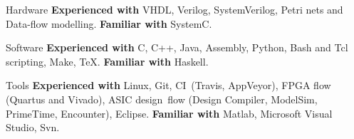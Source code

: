 
\vspace{-1mm}
\begin{cvskills}

\cvskill
{Hardware}
{\textbf{Experienced with} VHDL, Verilog, SystemVerilog, Petri nets and 
Data-flow modelling. \textbf{Familiar with} SystemC.}

\cvskill
{Software}
{\textbf{Experienced with} C, C++, Java, Assembly, Python, Bash and Tcl 
scripting, Make, TeX. \textbf{Familiar with} Haskell.}

\cvskill
{Tools}
{\textbf{Experienced with} Linux, Git, CI~(Travis, AppVeyor), FPGA 
flow (Quartus and Vivado), ASIC design~flow (Design Compiler, ModelSim, 
PrimeTime, Encounter), Eclipse. \textbf{Familiar with} Matlab, 
Microsoft Visual Studio, Svn.}

\end{cvskills}
\vspace{-4mm}

